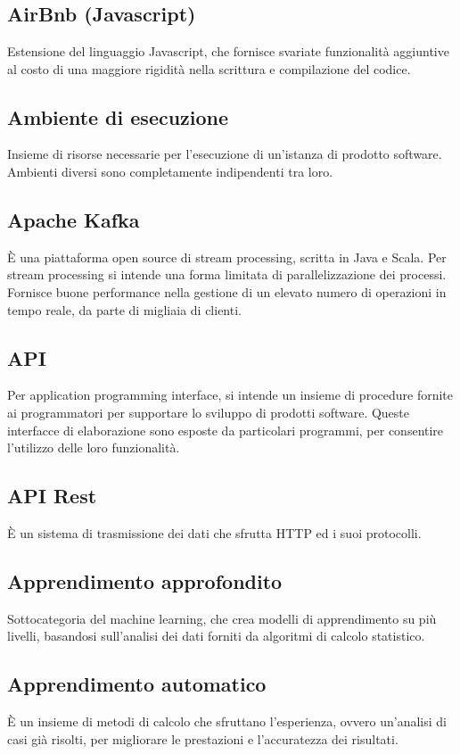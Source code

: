   \section[A]{}
  	\subsection*{AirBnb (Javascript)}
  	Estensione del linguaggio Javascript, che fornisce svariate funzionalità aggiuntive al costo di una maggiore rigidità nella scrittura e compilazione del codice.
	\subsection*{Ambiente di esecuzione}
	Insieme di risorse necessarie per l'esecuzione di un'istanza di prodotto software. Ambienti diversi sono completamente indipendenti tra loro.
	\subsection*{Apache Kafka}
	È una piattaforma open source di stream processing, scritta in Java e Scala. Per stream processing si intende una forma limitata di parallelizzazione dei processi. Fornisce buone performance nella gestione di un elevato numero di operazioni in tempo reale, da parte di migliaia di clienti.
	\subsection*{API}
	Per application programming interface, si intende un insieme di procedure fornite ai programmatori per supportare lo sviluppo di prodotti software. Queste interfacce di elaborazione sono esposte da particolari programmi, per consentire l’utilizzo delle loro funzionalità.
	\subsection*{API Rest}
	È un sistema di trasmissione dei dati che sfrutta HTTP ed i suoi protocolli.
	\subsection*{Apprendimento approfondito}
	Sottocategoria del machine learning, che crea modelli di apprendimento su più livelli, basandosi sull’analisi dei dati forniti da algoritmi di calcolo statistico.
	\subsection*{Apprendimento automatico}
	È un insieme di metodi di calcolo che sfruttano l’esperienza, ovvero un’analisi di casi già risolti, per migliorare le prestazioni e l’accuratezza dei risultati.

